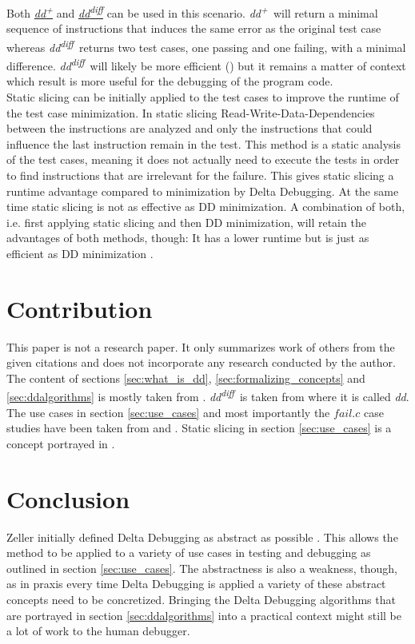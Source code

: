 \documentclass[a4paper,UKenglish]{lipics-v2018}
\newcommand{\ddp}{\textit{dd\textsuperscript{+}}}
\newcommand{\dddiff}{\textit{dd\textsuperscript{diff}}}
\begin{document}
Both \hyperref[fig:ddp]{\ddp} and \hyperref[fig:dddiff]{\dddiff} can be used in this scenario. \ddp\ will return a minimal sequence of instructions that induces the same error as the original test case whereas \dddiff\ returns two test cases, one passing and one failing, with a minimal difference. \dddiff\ will likely be more efficient (\cite{Zeller:2002:SIF:506201.506206})
 but it remains a matter of context which result is more useful for the debugging of the program code.\\

Static slicing can be initially applied to the test cases to improve the runtime of the test case minimization. In static slicing Read-Write-Data-Dependencies between the instructions are analyzed and only the instructions that could influence the last instruction remain in the test. This method is a static analysis of the test cases, meaning it does not actually need to execute the tests in order to find instructions that are irrelevant for the failure. This gives static slicing a runtime advantage compared to minimization by Delta Debugging. At the same time static slicing is not as effective as DD minimization. A combination of both, i.e. first applying static slicing and then DD minimization, will retain the advantages of both methods, though: It has a lower runtime but is just as efficient as DD minimization \cite{Leitner:2007:EUT:1321631.1321698}.

\section{Contribution}
\label{sec:contribution}

This paper is not a research paper. It only summarizes work of others from the given citations and does not incorporate any research conducted by the author. The content of sections \ref{sec:what_is_dd}, \ref{sec:formalizing_concepts} and \ref{sec:ddalgorithms} is mostly taken from \cite{Zeller:1999:YMP:318774.318946}. \dddiff\ is taken from \cite{Zeller:2002:SIF:506201.506206} where it is called \textit{dd}. The use cases in section \ref{sec:use_cases} and most importantly the $fail.c$ case studies have been taken from \cite{Zeller:2002:ICC:587051.587053} and \cite{Lei:2005:MRU:1104997.1105255}. Static slicing in section \ref{sec:use_cases} is a concept portrayed in \cite{Leitner:2007:EUT:1321631.1321698}.

\section{Conclusion}
\label{sec:conclusion}
Zeller initially defined Delta Debugging as abstract as possible \cite{Zeller:1999:YMP:318774.318946}. This allows the method to be applied to a variety of use cases in testing and debugging as outlined in section \ref{sec:use_cases}. The abstractness is also a weakness, though, as in praxis every time Delta Debugging is applied a variety of these abstract concepts need to be concretized. Bringing the Delta Debugging algorithms that are portrayed in section \ref{sec:ddalgorithms} into a practical context might still be a lot of work to the human debugger.
\end{document}

